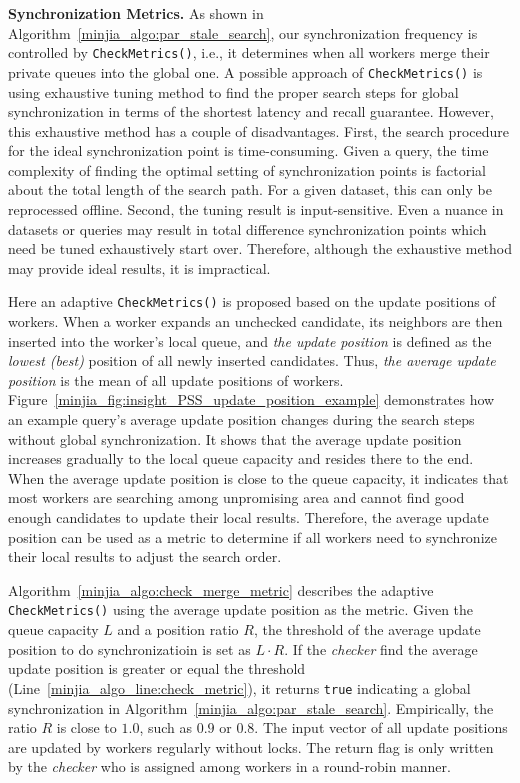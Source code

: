 \noindent\textbf{Synchronization Metrics.}
As shown in Algorithm~\ref{minjia_algo:par_stale_search}, our synchronization frequency is controlled by \texttt{CheckMetrics()}, i.e., it determines when all workers merge their private queues into the global one. 
A possible approach of \texttt{CheckMetrics()} is using exhaustive tuning method to find the proper search steps for global synchronization in terms of the shortest latency and recall guarantee. 
However, this exhaustive method has a couple of disadvantages. 
First, the search procedure for the ideal synchronization point is time-consuming. Given a query, the time complexity of finding the optimal setting of synchronization points is factorial about the total length of the search path.
For a given dataset, this can only be reprocessed offline.
Second, the tuning result is input-sensitive. Even a nuance in datasets or queries may result in total difference synchronization points which need be tuned exhaustively start over. Therefore, although the exhaustive method may provide ideal results, it is impractical.

Here an adaptive \texttt{CheckMetrics()} is proposed based on the update positions of workers. When a worker expands an unchecked candidate, its neighbors are then inserted into the worker's local queue, and \emph{the update position} is defined as the \emph{lowest (best)} position of all newly inserted candidates. Thus, \emph{the average update position} is the mean of all update positions of workers. 
Figure~\ref{minjia_fig:insight_PSS_update_position_example} demonstrates how an example query's average update position changes during the search steps without global synchronization. 
It shows that the average update position increases gradually to the local queue capacity and resides there to the end. 
When the average update position is close to the queue capacity, it indicates that most workers are searching among unpromising area and cannot find good enough candidates to update their local results.
Therefore, the average update position can be used as a metric to determine if all workers need to synchronize their local results to adjust the search order. 

Algorithm~\ref{minjia_algo:check_merge_metric} describes the adaptive \texttt{CheckMetrics()} using the average update position as the metric. Given the queue capacity $L$ and a position ratio $R$, the threshold of the average update position to do synchronizatioin is set as $L\cdot R$. 
If the \emph{checker} find the average update position is greater or equal the threshold (Line~\ref{minjia_algo_line:check_metric}), it returns \texttt{true} indicating a global synchronization in Algorithm~\ref{minjia_algo:par_stale_search}.
Empirically, the ratio $R$ is close to $1.0$, such as $0.9$ or $0.8$. The input vector of all update positions are updated by workers regularly without locks. The return flag is only written by the \emph{checker} who is assigned among workers in a round-robin manner.

